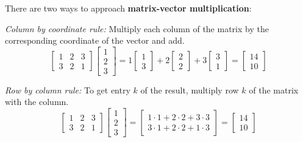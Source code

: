 \begin{definition}
There are two ways to approach \textbf{matrix-vector multiplication}: 

\textit{Column by coordinate rule:} Multiply each column of the matrix by the corresponding coordinate of the vector and add. 
$$\begin{bmatrix}
1 & 2 & 3 \\
3 & 2 & 1
\end{bmatrix} \begin{bmatrix}
1 \\
2 \\
3
\end{bmatrix} = 1 \begin{bmatrix}
1 \\
3
\end{bmatrix} + 2 \begin{bmatrix}
2 \\
2
\end{bmatrix} + 3 \begin{bmatrix}
3 \\
1
\end{bmatrix} = \begin{bmatrix}
14 \\
10
\end{bmatrix}$$

\textit{Row by column rule:} To get entry $k$ of the result, multiply row $k$ of the matrix with the column. 
$$\begin{bmatrix}
1 & 2 & 3 \\
3 & 2 & 1
\end{bmatrix} \begin{bmatrix}
1 \\
2 \\ 
3
\end{bmatrix} = \begin{bmatrix}
1 \cdot 1 + 2 \cdot 2 + 3 \cdot 3 \\
3 \cdot 1 + 2 \cdot 2 + 1 \cdot 3
\end{bmatrix} = \begin{bmatrix}
14 \\
10
\end{bmatrix}$$
\end{definition}

